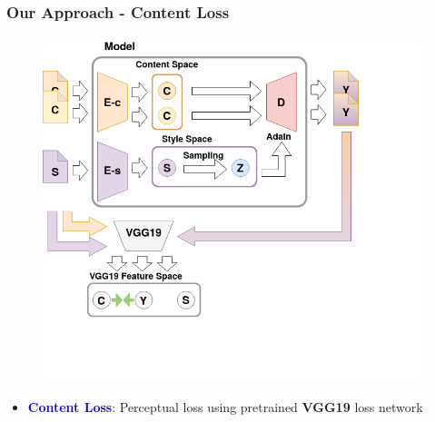 \documentclass[11pt,xcolor=dvipsnames]{beamer}
\begin{document}
\begin{frame}
  \addtocounter{framenumber}{-1}
\frametitle{Our Approach - Content Loss}
\begin{figure}
\centering
\includegraphics[scale=0.3]{pipelinecontent.png}
\end{figure}


\begin{itemize}
	\item \textcolor{blue}{\textbf{Content Loss}}: Perceptual loss using pretrained \textbf{VGG19} loss network
	\vspace{10pt}
\end{itemize}

\end{frame}
\end{document}
